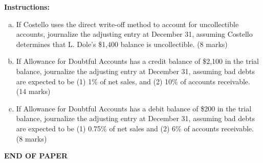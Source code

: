 \documentclass[12pt]{article}
\newcommand{\answerspace}[1]{\vspace{#1}}
\newcommand{\journalspace}{\vspace{4.5cm}}       %
\begin{document}
\textbf{Instructions:}
\begin{enumerate}[(a)]
    \item If Costello uses the direct write-off method to account for uncollectible accounts, journalize the adjusting entry at December 31, assuming Costello determines that L. Dole's \$1,400 balance is uncollectible. \hfill (8 marks)
    
    \journalspace
    
    \item If Allowance for Doubtful Accounts has a credit balance of \$2,100 in the trial balance, journalize the adjusting entry at December 31, assuming bad debts are expected to be (1) 1\% of net sales, and (2) 10\% of accounts receivable. \hfill (14 marks)
    
    \answerspace{5cm}
    
    \item If Allowance for Doubtful Accounts has a debit balance of \$200 in the trial balance, journalize the adjusting entry at December 31, assuming bad debts are expected to be (1) 0.75\% of net sales and (2) 6\% of accounts receivable. \hfill (8 marks)
    
    \journalspace
\end{enumerate}

\vfill
\begin{center}{\bf END OF PAPER}\end{center}
\end{document}
